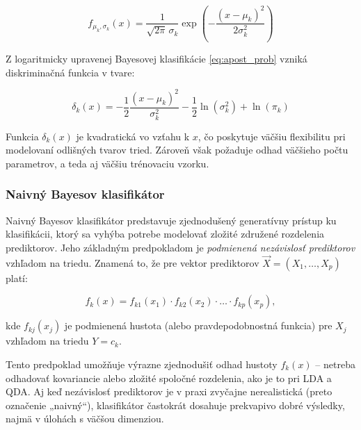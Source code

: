 \begin{equation}
f_{\mu_k,\sigma_k}(x) = \frac{1}{\sqrt{2\pi} \, \sigma_k} \exp\left( -\frac{(x - \mu_k)^2}{2\sigma_k^2} \right)
\end{equation}

Z logaritmicky upravenej Bayesovej klasifikácie \eqref{eq:apost_prob} vzniká diskriminačná funkcia v tvare:

\begin{equation}
\delta_k(x) = -\frac{1}{2} \frac{(x - \mu_k)^2}{\sigma_k^2} - \frac{1}{2} \ln(\sigma_k^2) + \ln(\pi_k)
\end{equation}

Funkcia $\delta_k(x)$ je kvadratická vo vzťahu k $x$, čo poskytuje väčšiu flexibilitu pri modelovaní odlišných tvarov tried. Zároveň však požaduje odhad väčšieho počtu parametrov, a teda aj väčšiu trénovaciu vzorku.

\subsubsection{Naivný Bayesov klasifikátor}
\label{subsubsec:naivebayes}

Naivný Bayesov klasifikátor predstavuje zjednodušený generatívny prístup ku klasifikácii, ktorý sa vyhýba potrebe modelovať zložité združené rozdelenia prediktorov. Jeho základným predpokladom je \textit{podmienená nezávislosť prediktorov} vzhľadom na triedu. Znamená to, že pre vektor prediktorov $\vec{X} = (X_1, \dots, X_p)$ platí:

\begin{equation}
f_k(x) = f_{k1}(x_1) \cdot f_{k2}(x_2) \cdot \dots \cdot f_{kp}(x_p),
\end{equation}

kde $f_{kj}(x_j)$ je podmienená hustota (alebo pravdepodobnostná funkcia) pre $X_j$ vzhľadom na triedu $Y = c_k$.

Tento predpoklad umožňuje výrazne zjednodušiť odhad hustoty $f_k(x)$ – netreba odhadovať kovariancie alebo zložité spoločné rozdelenia, ako je to pri LDA a QDA. Aj keď nezávislosť prediktorov je v praxi zvyčajne nerealistická (preto označenie „naivný“), klasifikátor častokrát dosahuje prekvapivo dobré výsledky, najmä v úlohách s väčšou dimenziou.

